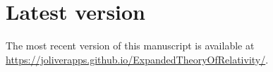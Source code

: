 
\section*{Latest version}\label{supmat_latest_version_note}
The most recent version of this manuscript is available at \url{https://joliverapps.github.io/ExpandedTheoryOfRelativity/}.
